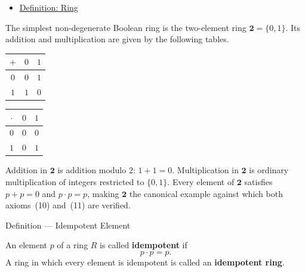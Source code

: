\begin{remark*}[Dependencies]
\begin{itemize}
  \item \hyperref[def:ring]{Definition: Ring}
\end{itemize}
\end{remark*}




\begin{example*}
The simplest non-degenerate Boolean ring is the two-element ring
$\mathbf{2} = \{0, 1\}$.
Its addition and multiplication are given by the following tables.

\begin{center}
\begin{tabular}{c|cc}
$+$ & $0$ & $1$ \\ \hline
$0$ & $0$ & $1$ \\
$1$ & $1$ & $0$
\end{tabular}
\qquad\qquad
\begin{tabular}{c|cc}
$\cdot$ & $0$ & $1$ \\ \hline
$0$ & $0$ & $0$ \\
$1$ & $0$ & $1$
\end{tabular}
\end{center}

\noindent
Addition in $\mathbf{2}$ is addition modulo $2$: $1 + 1 = 0$.
Multiplication in $\mathbf{2}$ is ordinary multiplication of
integers restricted to $\{0, 1\}$.
Every element of $\mathbf{2}$ satisfies $p + p = 0$ and
$p \cdot p = p$, making $\mathbf{2}$ the canonical example against
which both axioms~(10) and~(11) are verified.
\end{example*}


\begin{definitionbox}{Definition --- Idempotent Element}
\begin{definition}
\label{def:idempotent-element}
An element $p$ of a ring $R$ is called \textbf{idempotent} if
\[
p \cdot p = p.
\]
A ring in which every element is idempotent is called an
\textbf{idempotent ring}.
\end{definition}
\end{definitionbox}

